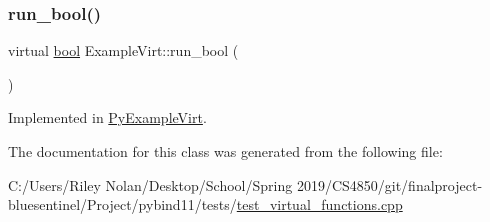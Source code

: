 \subsubsection{\texorpdfstring{run\_bool()}{run\_bool()}}
{\footnotesize\ttfamily virtual \mbox{\hyperlink{asdl_8h_af6a258d8f3ee5206d682d799316314b1}{bool}} Example\+Virt\+::run\+\_\+bool (\begin{DoxyParamCaption}{ }\end{DoxyParamCaption})\hspace{0.3cm}{\ttfamily [pure virtual]}}



Implemented in \mbox{\hyperlink{class_py_example_virt_ab6ad12451054f8d9004204ae5101f57c}{Py\+Example\+Virt}}.



The documentation for this class was generated from the following file\+:\begin{DoxyCompactItemize}
\item 
C\+:/\+Users/\+Riley Nolan/\+Desktop/\+School/\+Spring 2019/\+C\+S4850/git/finalproject-\/bluesentinel/\+Project/pybind11/tests/\mbox{\hyperlink{test__virtual__functions_8cpp}{test\+\_\+virtual\+\_\+functions.\+cpp}}\end{DoxyCompactItemize}
